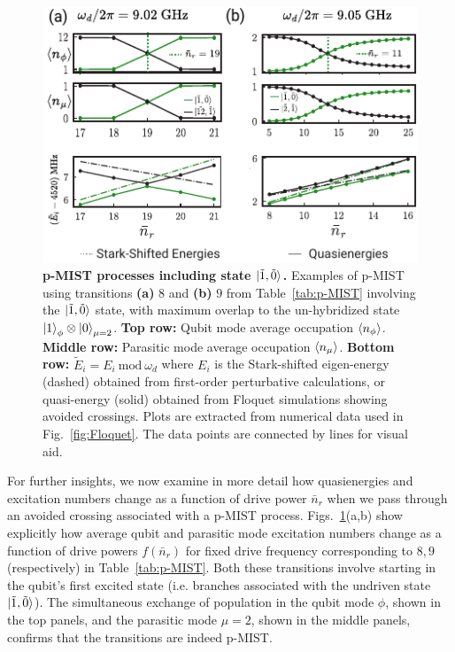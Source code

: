 \documentclass[%
reprint,
superscriptaddress,
 amsmath,amssymb,
 aps,
 prx,
longbibliography,
floatfix,
]{revtex4-2}
\begin{document}
 \begin{figure}[t]
    \centering
    \includegraphics[width=\linewidth]{Figures/Floquet_011.pdf}
    \caption{{\bf p-MIST processes including state $\ket{\tilde{1},\tilde{0}}$.} Examples of p-MIST using transitions \textbf{(a)} $8$ and \textbf{(b)} $9$ from Table~\ref{tab:p-MIST} involving the $\ket{\tilde{1},\tilde{0}}$ state, with maximum overlap to the un-hybridized state $\ket{1}_\phi\otimes\ket{0}_{\mu=2}$. \textbf{Top row:} Qubit mode average occupation $\braket{n_\phi}$. \textbf{Middle row:} Parasitic mode average occupation $\braket{n_\mu}$. \textbf{Bottom row:} $\tilde{E}_i=E_i \ \textrm{mod} \ \omega_d$ where $E_i$ is the Stark-shifted eigen-energy (dashed) obtained from first-order perturbative calculations, or quasi-energy (solid) obtained from Floquet simulations showing avoided crossings. Plots are extracted from numerical data used in Fig.~\ref{fig:Floquet}. The data points are connected by lines for visual aid.}
    \label{fig:011}
\end{figure}

For further insights, we now examine in more detail how quasienergies and excitation numbers change as a function of drive power $\bar{n}_r$ when we pass through an avoided crossing associated with a p-MIST process. Figs.~\ref{fig:011}(a,b) show explicitly how average qubit and parasitic mode excitation numbers change as a function of drive powers $f(\bar n_r)$ for fixed drive frequency corresponding to $8,9$ (respectively) in Table~\ref{tab:p-MIST}.  Both these transitions involve starting in the qubit's first excited state (i.e. branches associated with the undriven state $\ket{\tilde{1},\tilde{0}}$). The simultaneous exchange of population in the qubit mode $\phi$, shown in the top panels, and the parasitic mode $\mu=2$, shown in the middle panels, confirms that the transitions are indeed p-MIST. 
\end{document}
